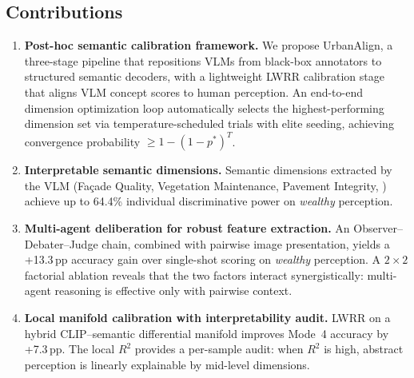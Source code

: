 \documentclass[runningheads]{llncs}
\begin{document}
\subsection{Contributions}

\begin{enumerate}
\item \textbf{Post-hoc semantic calibration framework.}
    We propose UrbanAlign, a three-stage pipeline that repositions VLMs from black-box annotators to structured semantic decoders, with a lightweight LWRR calibration stage that aligns VLM concept scores to human perception.
    An end-to-end dimension optimization loop automatically selects the highest-performing dimension set via temperature-scheduled trials with elite seeding, achieving convergence probability $\geq 1-(1-p^{*})^{T}$.

\item \textbf{Interpretable semantic dimensions.}
    Semantic dimensions extracted by the VLM (Fa\c{c}ade Quality, Vegetation Maintenance, Pavement Integrity, \etc) achieve up to 64.4\% individual discriminative power on \emph{wealthy} perception.

\item \textbf{Multi-agent deliberation for robust feature extraction.}
    An Observer--Debater--Judge chain, combined with pairwise image presentation, yields a +13.3\,pp accuracy gain over single-shot scoring on \emph{wealthy} perception.
    A $2{\times}2$ factorial ablation reveals that the two factors interact synergistically: multi-agent reasoning is effective only with pairwise context.

\item \textbf{Local manifold calibration with interpretability audit.}
    LWRR on a hybrid CLIP--semantic differential manifold improves Mode~4 accuracy by +7.3\,pp.
    The local $R^{2}$ provides a per-sample audit: when $R^{2}$ is high, abstract perception is linearly explainable by mid-level dimensions.
\end{enumerate}
\end{document}
